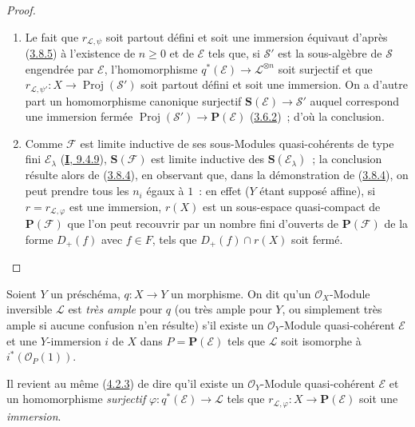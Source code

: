 \begin{proof}
\begin{enumerate}
  \item[\rm{(i)}] Le fait que $r_{\mathcal{L},\psi}$ soit partout défini et
  soit une immersion équivaut d'après
  (\hyperref[II.3.8.5-fr]{3.8.5}) à l'existence de $n\geq0$ et de
  $\mathcal{E}$ tels que, si $\mathcal{S}'$ est la sous-algèbre de
  $\mathcal{S}$ engendrée par $\mathcal{E}$, l'homomorphisme
  $q^*(\mathcal{E})\to\mathcal{L}^{\otimes n}$ soit surjectif et que
  $r_{\mathcal{L},\psi'}:X\to\operatorname{Proj}(\mathcal{S}')$ soit partout
  défini et soit une immersion. On a d'autre part un homomorphisme canonique
  surjectif $\mathbf{S}(\mathcal{E})\to\mathcal{S}'$ auquel correspond une
  immersion fermée
  $\operatorname{Proj}(\mathcal{S}')\to\mathbf{P}(\mathcal{E})$
  (\hyperref[II.3.6.2-fr]{3.6.2})~; d'où la conclusion.
  \item[\rm{(ii)}] Comme $\mathcal{F}$ est limite inductive de ses
  sous-Modules quasi-cohérents de type fini $\mathcal{E}_\lambda$
  (\hyperref[I.9.4.9-fr]{\textbf{I}, 9.4.9}), $\mathbf{S}(\mathcal{F})$ est limite
  inductive des $\mathbf{S}(\mathcal{E}_\lambda)$~; la conclusion résulte
  alors de (\hyperref[II.3.8.4-fr]{3.8.4}), en observant que, dans la
  démonstration de (\hyperref[II.3.8.4-fr]{3.8.4}), on peut prendre tous les
  $n_i$ égaux à $1$~: en effet ($Y$ étant supposé affine), si
  $r=r_{\mathcal{L},\varphi}$ est une immersion, $r(X)$ est un sous-espace
  quasi-compact de $\mathbf{P}(\mathcal{F})$ que l'on peut recouvrir par un
  nombre fini d'ouverts de $\mathbf{P}(\mathcal{F})$ de la forme $D_+(f)$ avec
  $f\in F$, tels que $D_+(f)\cap r(X)$ soit fermé.
\end{enumerate}
\end{proof}

\begin{definition}[4.4.2]
\label{II.4.4.2-fr}
Soient $Y$ un préschéma, $q:X\to Y$ un morphisme. On dit qu'un
$\mathcal{O}_X$-Module inversible $\mathcal{L}$ est \emph{très ample} pour
$q$ \textup{(ou} très ample pour $Y$\textup{, ou simplement} très ample \textup{si
aucune confusion n'en résulte)} s'il existe un $\mathcal{O}_Y$-Module
quasi-cohérent $\mathcal{E}$ et une $Y$-immersion $i$ de $X$ dans
$P=\mathbf{P}(\mathcal{E})$ tels que $\mathcal{L}$ soit isomorphe à
$i^*(\mathcal{O}_P(1))$.
\end{definition}

Il revient au même (\hyperref[II.4.2.3-fr]{4.2.3}) de dire qu'il existe un
$\mathcal{O}_Y$-Module quasi-cohérent $\mathcal{E}$ et un homomorphisme
\emph{surjectif} $\varphi:q^*(\mathcal{E})\to\mathcal{L}$ tels que
$r_{\mathcal{L},\varphi}:X\to\mathbf{P}(\mathcal{E})$ soit une \emph{immersion}.

